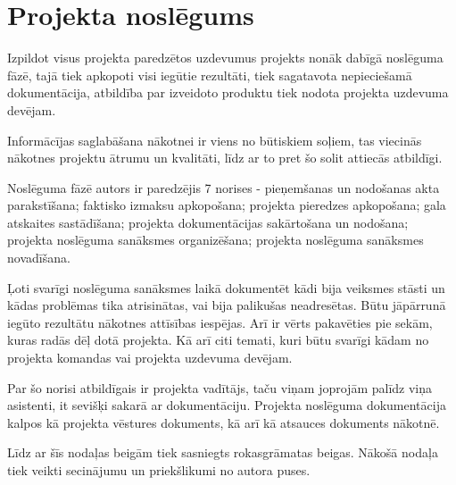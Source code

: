 \section{Projekta noslēgums}
Izpildot visus projekta paredzētos uzdevumus projekts nonāk dabīgā noslēguma fāzē,
tajā tiek apkopoti visi iegūtie rezultāti, tiek sagatavota nepieciešamā dokumentācija,
atbildība par izveidoto produktu tiek nodota projekta uzdevuma devējam.
\par
Informācījas saglabāšana nākotnei ir viens no būtiskiem soļiem, tas viecinās nākotnes
projektu ātrumu un kvalitāti, līdz ar to pret šo solit attiecās atbildīgi.
\par
Noslēguma fāzē autors ir paredzējis 7 norises - pieņemšanas un nodošanas akta parakstīšana;
faktisko izmaksu apkopošana; projekta pieredzes apkopošana; gala atskaites sastādīšana;
projekta dokumentācijas sakārtošana un nodošana; projekta noslēguma sanāksmes organizēšana;
projekta noslēguma sanāksmes novadīšana.
\par
Ļoti svarīgi noslēguma sanāksmes laikā dokumentēt kādi bija veiksmes stāsti un kādas problēmas
tika atrisinātas, vai bija palikušas neadresētas. Būtu jāpārrunā iegūto rezultātu nākotnes
attīsības iespējas. Arī ir vērts pakavēties pie sekām, kuras radās dēļ dotā projekta.
Kā arī citi temati, kuri būtu svarīgi kādam no projekta komandas vai projekta uzdevuma devējam.
\par
Par šo norisi atbildīgais ir projekta vadītājs, taču viņam joprojām palīdz viņa asistenti, it sevišķi
sakarā ar dokumentāciju. Projekta noslēguma dokumentācija kalpos kā projekta vēstures dokuments, kā 
arī kā atsauces dokuments nākotnē.
\par
Līdz ar šīs nodaļas beigām tiek sasniegts rokasgrāmatas beigas. Nākošā nodaļa tiek veikti secinājumu un 
priekšlikumi no autora puses.
